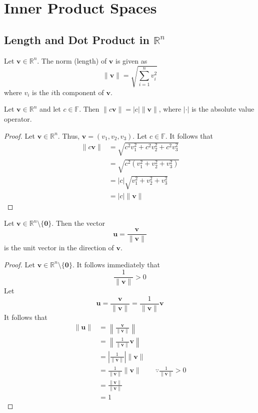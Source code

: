 \chapter{Inner Product Spaces}
\section{Length and Dot Product in \(\mathbb{R} ^n\)}
\begin{definition}
    Let \(\mathbf{v} \in\mathbb{R} ^n\). The norm (length) of \(\mathbf{v} \) is given as
    \[
        \lVert \mathbf{v}  \rVert =\sqrt{\sum_{i=1}^n v_i^2} 
    \]
    where \(v_i\) is the \(i\)th component of \(\mathbf{v} \).
\end{definition}	
\begin{theorem}
    Let \(\mathbf{v} \in \mathbb{R} ^n\) and let \(c\in\mathbb{F} \). Then \(\|c \mathbf{v} \| =|c|\|\mathbf{v} \|\), where \(|\cdot|\) is the absolute value operator.
\end{theorem}
\begin{proof}
    Let \(\mathbf{v} \in \mathbb{R} ^n\). Thus, \(\mathbf{v} =\left( v_1,v_2,v_3 \right) \). Let \(c\in\mathbb{F} \). It follows that
\begin{align*}
        \|c \mathbf{v} \| &= \sqrt{c^2 v_1^2 + c^2 v_2^2 + c^2 v_3^2} \\
        &=\sqrt{c^2 \left( v_1^2 + v_2^2 + v_3^2 \right) } \\
        &=|c|\sqrt{v_1^2 + v_2^2 + v_3^2} \\
        &=|c|\|\mathbf{v} \|
\end{align*}
\end{proof}
\begin{theorem}
    Let \(\mathbf{v} \in\mathbb{R} ^n\setminus \{ \mathbf{0}  \} \). Then the vector
    \[
        \mathbf{u}  = \frac{\mathbf{v} }{\|\mathbf{v} \|}
    \]
    is the unit vector in the direction of \(\mathbf{v} \).
\end{theorem}
\begin{proof}
    Let \(\mathbf{v} \in\mathbb{R} ^n\setminus \{ \mathbf{0}  \} \). It follows immediately that
    \[
        \frac{1}{\|\mathbf{v} \|}>0
    \]
Let
\[
    \mathbf{u} =\frac{\mathbf{v} }{\|\mathbf{v} \|}= \frac{1}{\|\mathbf{v} \|}\mathbf{v} 
\]
It follows that
\begin{align*}
    \|\mathbf{u} \| &= \left\|\frac{\mathbf{v} }{\|\mathbf{v}\| }\right\|\\
    &= \left\| \frac{1}{\|\mathbf{v} \|}\mathbf{v}  \right\|\\
    &= \left\vert \frac{1}{\|\mathbf{v} \|} \right\vert \|\mathbf{v} \|\\
    &= \frac{1}{\|\mathbf{v} \|}\|\mathbf{v} \| \qquad \because \frac{1}{\|\mathbf{v} \|}>0\\
    &= \frac{\|\mathbf{v} \|}{\|\mathbf{v} \|}\\
    &=1
\end{align*}
\end{proof}
